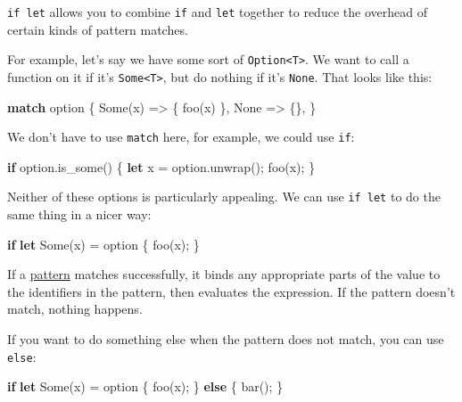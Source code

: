 \documentclass[a4paper,]{book}
\newenvironment{Shaded}{\begin{snugshade}}{\end{snugshade}}
\newcommand{\KeywordTok}[1]{\textcolor[rgb]{0.13,0.29,0.53}{\textbf{{#1}}}}
\newcommand{\ConstantTok}[1]{\textcolor[rgb]{0.00,0.00,0.00}{{#1}}}
\newcommand{\NormalTok}[1]{{#1}}
\begin{document}
\texttt{if\ let} allows you to combine \texttt{if} and \texttt{let}
together to reduce the overhead of certain kinds of pattern matches.

For example, let's say we have some sort of
\texttt{Option\textless{}T\textgreater{}}. We want to call a function on
it if it's \texttt{Some\textless{}T\textgreater{}}, but do nothing if
it's \texttt{None}. That looks like this:

\begin{Shaded}
\begin{Highlighting}[]
\KeywordTok{match} \NormalTok{option \{}
    \ConstantTok{Some}\NormalTok{(x) => \{ foo(x) \},}
    \ConstantTok{None} \NormalTok{=> \{\},}
\NormalTok{\}}
\end{Highlighting}
\end{Shaded}

We don't have to use \texttt{match} here, for example, we could use
\texttt{if}:

\begin{Shaded}
\begin{Highlighting}[]
\KeywordTok{if} \NormalTok{option.is_some() \{}
    \KeywordTok{let} \NormalTok{x = option.unwrap();}
    \NormalTok{foo(x);}
\NormalTok{\}}
\end{Highlighting}
\end{Shaded}

Neither of these options is particularly appealing. We can use
\texttt{if\ let} to do the same thing in a nicer way:

\begin{Shaded}
\begin{Highlighting}[]
\KeywordTok{if} \KeywordTok{let} \ConstantTok{Some}\NormalTok{(x) = option \{}
    \NormalTok{foo(x);}
\NormalTok{\}}
\end{Highlighting}
\end{Shaded}

If a \protect\hyperlink{sec--patterns}{pattern} matches successfully, it
binds any appropriate parts of the value to the identifiers in the
pattern, then evaluates the expression. If the pattern doesn't match,
nothing happens.

If you want to do something else when the pattern does not match, you
can use \texttt{else}:

\begin{Shaded}
\begin{Highlighting}[]
\KeywordTok{if} \KeywordTok{let} \ConstantTok{Some}\NormalTok{(x) = option \{}
    \NormalTok{foo(x);}
\NormalTok{\} }\KeywordTok{else} \NormalTok{\{}
    \NormalTok{bar();}
\NormalTok{\}}
\end{Highlighting}
\end{Shaded}
\end{document}

